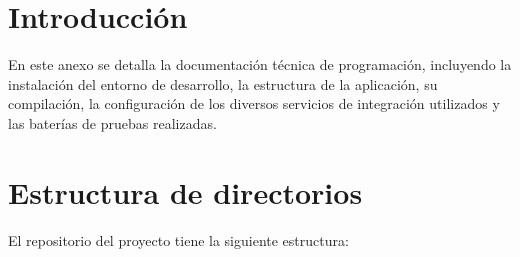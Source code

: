 
\section{Introducción}\label{introducción}

En este anexo se detalla la documentación técnica de programación, incluyendo la instalación del entorno de desarrollo, la estructura de la aplicación, su compilación, la configuración de los diversos servicios de integración utilizados y las baterías de pruebas realizadas.

\section{Estructura de directorios}\label{estructura-de-directorios}

El repositorio del proyecto tiene la siguiente estructura:


